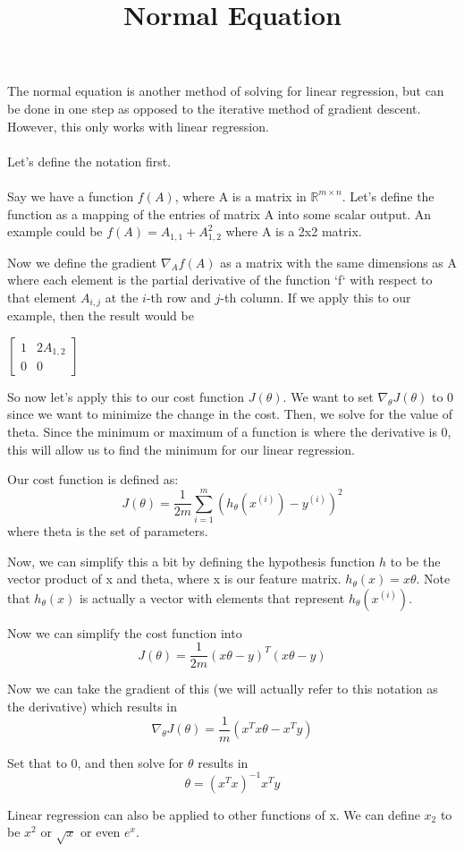 \documentclass[11pt]{article}
\title{Normal Equation}
\author{}
\date{}
\begin{document}
\maketitle
\vspace{-1.2em}
The normal equation is another method of solving for linear regression,
but can be done in one step as opposed to the iterative method of gradient descent.
However, this only works with linear regression.\\
\vspace{0.5em}\\
Let's define the notation first.\\
\vspace{0.5em}\\
Say we have a function $f(A)$, where A is a matrix in $\mathbb{R}^{m \times n}$.
Let's define the function as a mapping of the entries of matrix A
into some scalar output. An example could be $f(A) = A_{1,1} + A_{1,2}^{2}$ where A is a 2x2 matrix.

Now we define the gradient $\nabla_{A} {f(A)}$ as a matrix with the same dimensions
as A where each element is the partial derivative of the function `f` with respect
to that element $A_{i,j}$ at the $i$-th row and $j$-th column. If we apply this to our example,
then the result would be \hfill
\begin{center}
$\begin{bmatrix}
1 & 2A_{1,2} \\
0 & 0
\end{bmatrix}$
\end{center}
So now let's apply this to our cost function $J(\theta)$. We want to set
$\nabla_{\theta} {J(\theta)}$ to 0 since we want to minimize the change in the cost.
Then, we solve for the value of theta. Since the minimum or maximum of a function is where
the derivative is 0, this will allow us to find the minimum for our linear regression.

Our cost function is defined as:
$$J(\theta) = \frac{1}{2m}\sum_{i=1}^{m} {\left ( h_{\theta}\left (x^{(i)} \right )-y^{(i)} \right )}^{2}$$
where theta is the set of parameters.

Now, we can simplify this a bit by defining the hypothesis function $h$ to be the vector product
of x and theta, where x is our feature matrix. $h_{\theta}(x) = x\theta$.
Note that $h_{\theta}(x)$ is actually a vector with elements that represent $h_{\theta}\left (x^{(i)} \right )$.

Now we can simplify the cost function into
$$J(\theta) = \frac{1}{2m}(x\theta - y)^{T}(x\theta - y)$$

Now we can take the gradient of this (we will actually refer to this notation as the derivative)
which results in
$$\nabla_{\theta} {J(\theta)} = \frac{1}{m}\left( x^{T}x\theta - x^{T}y \right)$$

Set that to 0, and then solve for $\theta$ results in
$$\theta = (x^{T}x)^{-1}x^{T}y$$

Linear regression can also be applied to other functions of x.
We can define $x_2$ to be $x^2$ or $\sqrt{x}$ or even $e^x$.
\end{document}
